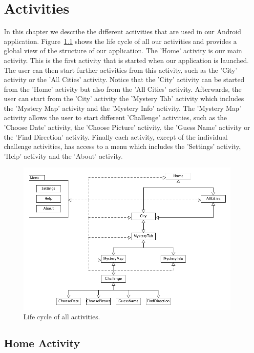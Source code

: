 \chapter{Activities}

In this chapter we describe the different activities that are used in our Android application. Figure~\ref{fig:activitiesLifeCycle} shows the life cycle of all our activities and provides a global view of the structure of our application. The 'Home' activity is our main activity. This is the first activity that is started when our application is launched. The user can then start further activities from this activity, such as the 'City' activity or the 'All Cities' activity. Notice that the 'City' activity can be started from the 'Home' activity but also from the 'All Cities' activity. Afterwards, the user can start from the 'City' activity the 'Mystery Tab' activity which includes the 'Mystery Map' activity and the 'Mystery Info' activity. The 'Mystery Map' activity allows the user to start different 'Challenge' activities, such as the 'Choose Date' activity, the 'Choose Picture' activity, the 'Guess Name' activity or the 'Find Direction' activity. Finally each activity, except of the individual challenge activities, has access to a menu which includes the 'Settings' activity, 'Help' activity and the 'About' activity.

\begin{figure}[H]
	\centering
	\includegraphics[scale=0.4]{Figures/ActivityLifeCycle}
	\caption{Life cycle of all activities.}
	\label{fig:activitiesLifeCycle}
\end{figure}

\section{Home Activity}

